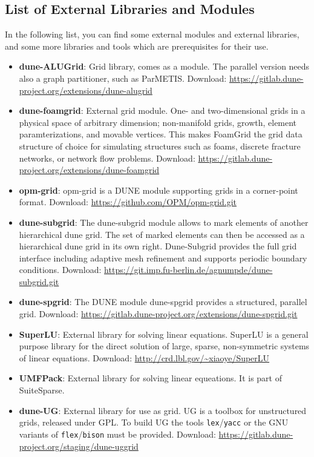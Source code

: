 \subsection{List of External Libraries and Modules}
In the following list, you can find some external modules and external libraries,
and some more libraries and tools which are prerequisites for their use.

\begin{itemize}
\item \textbf{dune-ALUGrid}: Grid library, comes as a \Dune module.
  The parallel version needs also a graph partitioner, such as {ParMETIS}.
  Download: \url{https://gitlab.dune-project.org/extensions/dune-alugrid}

\item \textbf{dune-foamgrid}: External grid module. One- and two-dimensional grids
  in a physical space of arbitrary dimension; non-manifold grids, growth, element
  paramterizations, and movable vertices. This makes FoamGrid the grid data structure
  of choice for simulating structures such as foams, discrete fracture networks,
  or network flow problems.
  Download: \url{https://gitlab.dune-project.org/extensions/dune-foamgrid}
  
\item \textbf{opm-grid}: opm-grid is a DUNE module supporting grids in a corner-point format.
  Download: \url{https://github.com/OPM/opm-grid.git}
  
\item \textbf{dune-subgrid}: The dune-subgrid module allows to mark elements of another hierarchical dune grid.
The set of marked elements can then be accessed as a hierarchical dune grid in its own right.
Dune-Subgrid provides the full grid interface including adaptive mesh refinement
and supports periodic boundary conditions.
  Download: \url{https://git.imp.fu-berlin.de/agnumpde/dune-subgrid.git}
  
\item \textbf{dune-spgrid}: The DUNE module dune-spgrid provides a structured, parallel grid.
  Download: \url{https://gitlab.dune-project.org/extensions/dune-spgrid.git}

\item \textbf{SuperLU}: External library for solving linear equations. SuperLU is a general purpose
  library for the direct solution of large, sparse, non-symmetric systems of linear equations.
  Download: \url{http://crd.lbl.gov/~xiaoye/SuperLU}

\item \textbf{UMFPack}: External library for solving linear equeations. It is part of SuiteSparse.

\item \textbf{dune-UG}: External library for use as grid. UG is a toolbox for unstructured grids, released under GPL.
  To build UG the tools \texttt{lex}/\texttt{yacc} or the GNU variants of \texttt{flex}/\texttt{bison} must be provided.
  Download: \url{https://gitlab.dune-project.org/staging/dune-uggrid}
\end{itemize}

